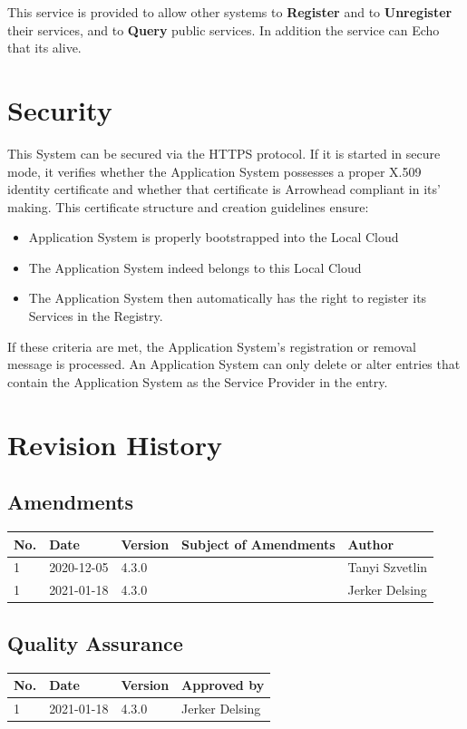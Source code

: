 \documentclass[a4paper]{arrowhead}
\begin{document}
This service is provided to allow other systems to \textbf{Register}
and to \textbf{Unregister} their services, and to \textbf{Query}
public services. In addition the service can Echo that its alive.

\section{Security}
\label{sec:security}

This System can be secured via the HTTPS protocol. If it is started in secure mode, it verifies whether the Application System possesses a proper X.509 identity certificate and whether that certificate is Arrowhead compliant in its' making. This certificate structure and creation guidelines ensure:

\begin{itemize}
    \item Application System is properly bootstrapped into the Local Cloud
    \item The Application System indeed belongs to this Local Cloud
    \item The Application System then automatically has the right to register its Services in the Registry.
   
\end{itemize}

 If these criteria are met, the Application System’s registration or removal message is processed. An Application System can only delete or alter entries that contain the Application System as the Service Provider in the entry.



\newpage




\newpage

\section{Revision History}
\subsection{Amendments}

\noindent\begin{tabularx}{\textwidth}{| p{1cm} | p{3cm} | p{2cm} | X | p{4cm} |} \hline
\rowcolor{gray!33} No. & Date & Version & Subject of Amendments & Author \\ \hline

1 & 2020-12-05 & 4.3.0 &  & Tanyi Szvetlin \\ \hline
1 & 2021-01-18 & 4.3.0 & & Jerker Delsing \\ \hline

\end{tabularx}

\subsection{Quality Assurance}

\noindent\begin{tabularx}{\textwidth}{| p{1cm} | p{3cm} | p{2cm} | X |} \hline
\rowcolor{gray!33} No. & Date & Version & Approved by \\ \hline

1 & 2021-01-18 & 4.3.0 & Jerker Delsing \\ \hline

\end{tabularx}
\end{document}
